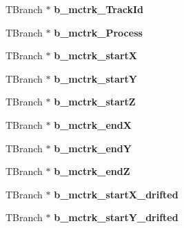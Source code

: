 \begin{DoxyCompactItemize}
\item 
\hypertarget{classanatree_a828f3587133777ec56bd00d8fe05e125}{T\-Branch $\ast$ {\bfseries b\-\_\-mctrk\-\_\-\-Track\-Id}}\label{classanatree_a828f3587133777ec56bd00d8fe05e125}

\item 
\hypertarget{classanatree_a9676ff614a45f43fb8ea5541dd503b50}{T\-Branch $\ast$ {\bfseries b\-\_\-mctrk\-\_\-\-Process}}\label{classanatree_a9676ff614a45f43fb8ea5541dd503b50}

\item 
\hypertarget{classanatree_af456b97fcd09b432bd8a81257e16d10f}{T\-Branch $\ast$ {\bfseries b\-\_\-mctrk\-\_\-start\-X}}\label{classanatree_af456b97fcd09b432bd8a81257e16d10f}

\item 
\hypertarget{classanatree_a37bf56ef7fa57b25a44e5eed121ea0f9}{T\-Branch $\ast$ {\bfseries b\-\_\-mctrk\-\_\-start\-Y}}\label{classanatree_a37bf56ef7fa57b25a44e5eed121ea0f9}

\item 
\hypertarget{classanatree_ac3fd624f924b8d0b7fec2f3f7e672f65}{T\-Branch $\ast$ {\bfseries b\-\_\-mctrk\-\_\-start\-Z}}\label{classanatree_ac3fd624f924b8d0b7fec2f3f7e672f65}

\item 
\hypertarget{classanatree_a75b9f3307ec11a9016ef89f8c9fe2ba7}{T\-Branch $\ast$ {\bfseries b\-\_\-mctrk\-\_\-end\-X}}\label{classanatree_a75b9f3307ec11a9016ef89f8c9fe2ba7}

\item 
\hypertarget{classanatree_a9732e878e8e131a7675e96b44e5ed281}{T\-Branch $\ast$ {\bfseries b\-\_\-mctrk\-\_\-end\-Y}}\label{classanatree_a9732e878e8e131a7675e96b44e5ed281}

\item 
\hypertarget{classanatree_ab6cdc926b8a4665def63da9b72af6bdc}{T\-Branch $\ast$ {\bfseries b\-\_\-mctrk\-\_\-end\-Z}}\label{classanatree_ab6cdc926b8a4665def63da9b72af6bdc}

\item 
\hypertarget{classanatree_a8e7266d6a85ad00cd392c71ac8d42a41}{T\-Branch $\ast$ {\bfseries b\-\_\-mctrk\-\_\-start\-X\-\_\-drifted}}\label{classanatree_a8e7266d6a85ad00cd392c71ac8d42a41}

\item 
\hypertarget{classanatree_a1cb5c83a9e72e123b9369d22131ca5a5}{T\-Branch $\ast$ {\bfseries b\-\_\-mctrk\-\_\-start\-Y\-\_\-drifted}}\label{classanatree_a1cb5c83a9e72e123b9369d22131ca5a5}


\end{DoxyCompactItemize}
